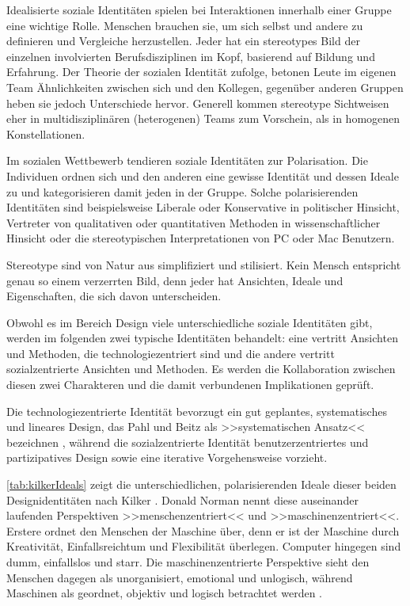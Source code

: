 \medskip Idealisierte soziale Identitäten spielen bei Interaktionen innerhalb einer Gruppe eine wichtige Rolle. Menschen brauchen sie, um sich selbst und andere zu definieren und Vergleiche herzustellen. Jeder hat ein stereotypes Bild der einzelnen involvierten Berufsdisziplinen im Kopf, basierend auf Bildung und Erfahrung. Der Theorie der sozialen Identität zufolge, betonen Leute im eigenen Team Ähnlichkeiten zwischen sich und den Kollegen, gegenüber anderen Gruppen heben sie jedoch Unterschiede hervor. Generell kommen stereotype Sichtweisen eher in multidisziplinären (heterogenen) Teams zum Vorschein, als in homogenen Konstellationen.

\medskip Im sozialen Wettbewerb tendieren soziale Identitäten zur Polarisation. Die Individuen ordnen sich und den anderen eine gewisse Identität und dessen Ideale zu und kategorisieren damit jeden in der Gruppe. Solche polarisierenden Identitäten sind beispielsweise Liberale oder Konservative in politischer Hinsicht, Vertreter von qualitativen oder quantitativen Methoden in wissenschaftlicher Hinsicht oder die stereotypischen Interpretationen von PC oder Mac Benutzern.

Stereotype sind von Natur aus simplifiziert und stilisiert. Kein Mensch entspricht genau so einem verzerrten Bild, denn jeder hat Ansichten, Ideale und Eigenschaften, die sich davon unterscheiden. 

\medskip Obwohl es im Bereich Design viele unterschiedliche soziale Identitäten gibt, werden im folgenden zwei typische Identitäten behandelt: eine vertritt Ansichten und Methoden, die technologiezentriert sind und die andere vertritt sozialzentrierte Ansichten und Methoden. Es werden die Kollaboration zwischen diesen zwei Charakteren und die damit verbundenen Implikationen geprüft\citep{Kilker:1999}.

Die technologiezentrierte Identität bevorzugt ein gut geplantes, systematisches und lineares Design, das Pahl und Beitz als >>systematischen Ansatz<< bezeichnen \citep{Pahl:1988}, während die sozialzentrierte Identität benutzerzentriertes und partizipatives Design sowie eine iterative Vorgehensweise vorzieht.

\autoref{tab:kilkerIdeals} zeigt die unterschiedlichen, polarisierenden Ideale dieser beiden Designidentitäten nach Kilker \citep{Kilker:1999}. Donald Norman nennt diese auseinander laufenden Perspektiven >>menschenzentriert<< und >>maschinenzentriert<<. Erstere ordnet den Menschen der Maschine über, denn er ist der Maschine durch Kreativität, Einfallsreichtum und Flexibilität überlegen. Computer hingegen sind dumm, einfallslos und starr. Die maschinenzentrierte Perspektive sieht den Menschen dagegen als unorganisiert, emotional und unlogisch, während Maschinen als geordnet, objektiv und logisch betrachtet werden \citep{Norman:1994}. 

